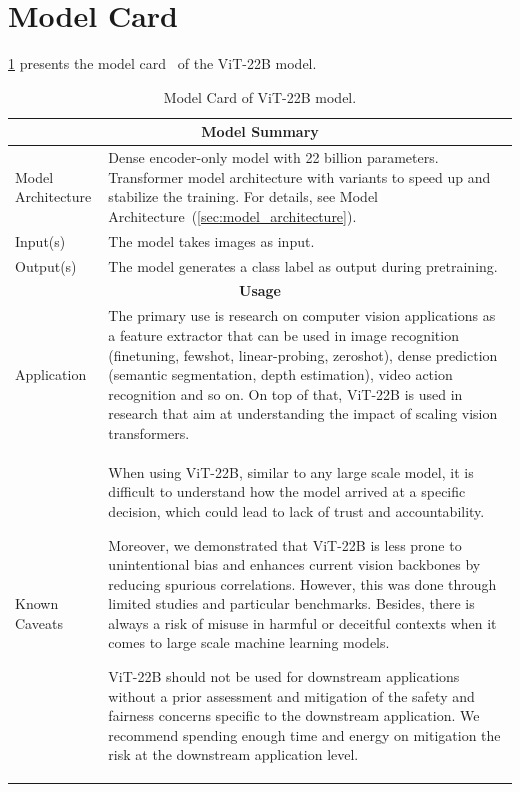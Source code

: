 \documentclass{article}
\newcommand{\chonk}{\mbox{ViT-22B}\xspace}
\begin{document}
\section{Model Card}
\label{app:model_card}

\cref{tab:model_card} presents the model card~\citep{mitchell2019model} of the \chonk model.

{\fontsize{9pt}{9pt}\selectfont
\begin{longtable}[c]{ p{} | p{} }
\caption{Model Card of \chonk model.}
\label{tab:model_card}
\endfirsthead
\endhead
\toprule
\multicolumn{2}{c}{\textbf{Model Summary}}      \\ \toprule
\multicolumn{1}{l|}{Model Architecture} & 
Dense encoder-only model with 22 billion parameters. Transformer model architecture with variants to speed up and stabilize the training. For details, see Model Architecture~(\cref{sec:model_architecture}).  \\ \midrule
\multicolumn{1}{l|}{Input(s)} & 
The model takes images as input. 
\\ \midrule
\multicolumn{1}{l|}{Output(s)} & 
The model generates a class label as output during pretraining. 
\\
\toprule
\multicolumn{2}{c}{\textbf{Usage}}      \\ \toprule
\multicolumn{1}{l|}{Application} & 
The primary use is research on computer vision applications as a feature extractor that can be used in image recognition (finetuning, fewshot, linear-probing, zeroshot), dense prediction (semantic segmentation, depth estimation), video action recognition and so on. On top of that, \chonk is used in research that aim at understanding the impact of scaling vision transformers. 
\\ 
\midrule
\multicolumn{1}{l|}{Known Caveats} & 
When using \chonk, similar to any large scale model, it is difficult to understand how the model arrived at a specific decision, which could lead to lack of trust and accountability.

Moreover, we demonstrated that \chonk is less prone to unintentional bias and enhances current vision backbones by reducing spurious correlations. However, this was done through limited studies and particular benchmarks. Besides, there is always a risk of misuse in harmful or deceitful contexts when it comes to large scale machine learning models. 

\chonk should not be used for downstream applications without a prior assessment and mitigation of the safety and fairness concerns specific to the downstream application. We recommend spending enough time and energy on mitigation the risk at the downstream application level.  
\\
\toprule


\end{longtable}}
\end{document}
